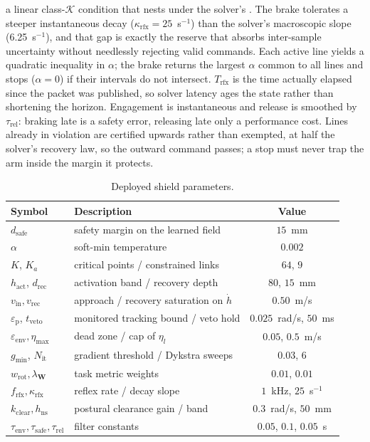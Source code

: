 \documentclass[journal]{IEEEtran}
\newcommand{\dsafe}{d_{\mathrm{safe}}}
\begin{document}
a linear class-$\mathcal{K}$ condition that nests under the solver's \cite{Rosolia2022Unified}. The brake tolerates a steeper instantaneous decay ($\kappa_{\mathrm{rfx}}=25$~s$^{-1}$) than the solver's macroscopic slope (6.25~s$^{-1}$), and that gap is exactly the reserve that absorbs inter-sample uncertainty without needlessly rejecting valid commands. Each active line yields a quadratic inequality in $\alpha$; the brake returns the largest $\alpha$ common to all lines and stops ($\alpha=0$) if their intervals do not intersect. $T_{\mathrm{rfx}}$ is the time actually elapsed since the packet was published, so solver latency ages the state rather than shortening the horizon. Engagement is instantaneous and release is smoothed by $\tau_{\mathrm{rel}}$: braking late is a safety error, releasing late only a performance cost. Lines already in violation are certified upwards rather than exempted, at half the solver's recovery law, so the outward command passes; a stop must never trap the arm inside the margin it protects.

\begin{table}[t]
\caption{Deployed shield parameters.}
\label{tab:params}
\centering
\footnotesize
\begin{tabular}{llc}
\toprule
\textbf{Symbol} & \textbf{Description} & \textbf{Value}\\
\midrule
$\dsafe$ & safety margin on the learned field & $15$~mm\\
$\alpha$ & soft-min temperature & $0.002$\\
$K$, $K_a$ & critical points / constrained links & $64$, $9$\\
$h_{\mathrm{act}}$, $d_{\mathrm{rec}}$ & activation band / recovery depth & $80$, $15$~mm\\
$v_{\mathrm{in}},v_{\mathrm{rec}}$ & approach / recovery saturation on $\dot h$ & $0.50$~m/s\\
$\varepsilon_{\mathrm{p}}$, $t_{\mathrm{veto}}$ & monitored tracking bound / veto hold & $0.025$~rad/s, $50$~ms\\
$\varepsilon_{\mathrm{env}},\eta_{\max}$ & dead zone / cap of $\eta_l$ & $0.05$, $0.5$~m/s\\
$g_{\min}$, $N_{\mathrm{it}}$ & gradient threshold / Dykstra sweeps & $0.03$, $6$\\
$w_{\mathrm{rot}},\lambda_{\mathbf{W}}$ & task metric weights & $0.01$, $0.01$\\
$f_{\mathrm{rfx}},\kappa_{\mathrm{rfx}}$ & reflex rate / decay slope & $1$~kHz, $25$~s$^{-1}$\\
$k_{\mathrm{clear}},h_{\mathrm{ns}}$ & postural clearance gain / band & $0.3$~rad/s, $50$~mm\\
$\tau_{\mathrm{env}},\tau_{\mathrm{safe}},\tau_{\mathrm{rel}}$ & filter constants & $0.05$, $0.1$, $0.05$~s\\
\bottomrule
\end{tabular}
\end{table}
\end{document}
